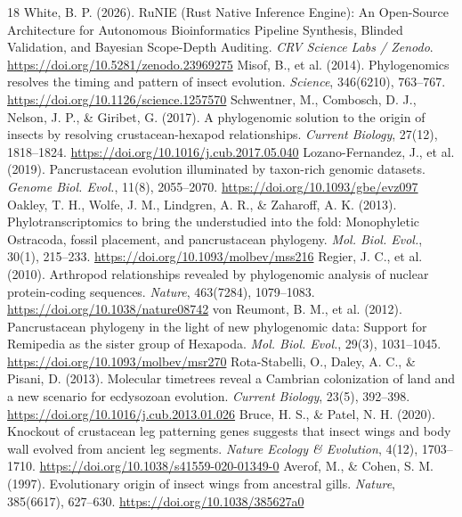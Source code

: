 \documentclass[10pt,letterpaper]{article}
\begin{document}
\begin{thebibliography}{18}
 White, B. P. (2026). RuNIE (Rust Native Inference Engine): An Open-Source Architecture for Autonomous Bioinformatics Pipeline Synthesis, Blinded Validation, and Bayesian Scope-Depth Auditing. \textit{CRV Science Labs / Zenodo}. \url{https://doi.org/10.5281/zenodo.23969275}
 Misof, B., et al. (2014). Phylogenomics resolves the timing and pattern of insect evolution. \textit{Science}, 346(6210), 763--767. \url{https://doi.org/10.1126/science.1257570}
 Schwentner, M., Combosch, D. J., Nelson, J. P., \& Giribet, G. (2017). A phylogenomic solution to the origin of insects by resolving crustacean-hexapod relationships. \textit{Current Biology}, 27(12), 1818--1824. \url{https://doi.org/10.1016/j.cub.2017.05.040}
 Lozano-Fernandez, J., et al. (2019). Pancrustacean evolution illuminated by taxon-rich genomic datasets. \textit{Genome Biol. Evol.}, 11(8), 2055--2070. \url{https://doi.org/10.1093/gbe/evz097}
 Oakley, T. H., Wolfe, J. M., Lindgren, A. R., \& Zaharoff, A. K. (2013). Phylotranscriptomics to bring the understudied into the fold: Monophyletic Ostracoda, fossil placement, and pancrustacean phylogeny. \textit{Mol. Biol. Evol.}, 30(1), 215--233. \url{https://doi.org/10.1093/molbev/mss216}
 Regier, J. C., et al. (2010). Arthropod relationships revealed by phylogenomic analysis of nuclear protein-coding sequences. \textit{Nature}, 463(7284), 1079--1083. \url{https://doi.org/10.1038/nature08742}
 von Reumont, B. M., et al. (2012). Pancrustacean phylogeny in the light of new phylogenomic data: Support for Remipedia as the sister group of Hexapoda. \textit{Mol. Biol. Evol.}, 29(3), 1031--1045. \url{https://doi.org/10.1093/molbev/msr270}
 Rota-Stabelli, O., Daley, A. C., \& Pisani, D. (2013). Molecular timetrees reveal a Cambrian colonization of land and a new scenario for ecdysozoan evolution. \textit{Current Biology}, 23(5), 392--398. \url{https://doi.org/10.1016/j.cub.2013.01.026}
 Bruce, H. S., \& Patel, N. H. (2020). Knockout of crustacean leg patterning genes suggests that insect wings and body wall evolved from ancient leg segments. \textit{Nature Ecology \& Evolution}, 4(12), 1703--1710. \url{https://doi.org/10.1038/s41559-020-01349-0}
 Averof, M., \& Cohen, S. M. (1997). Evolutionary origin of insect wings from ancestral gills. \textit{Nature}, 385(6617), 627--630. \url{https://doi.org/10.1038/385627a0}

\end{thebibliography}
\end{document}
